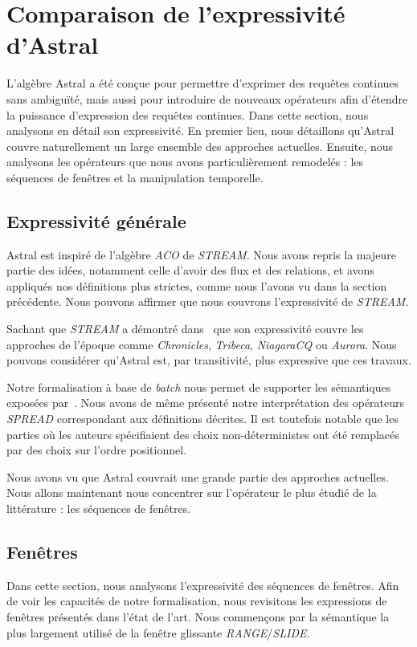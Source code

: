 \section{Comparaison de l'expressivité d'Astral}\label{sec:valid:expressivite:comparaison}
L'algèbre Astral a été conçue pour permettre d'exprimer des requêtes continues sans ambiguïté, mais aussi pour introduire de nouveaux opérateurs afin d'étendre la puissance d'expression des requêtes continues. Dans cette section, nous analysons en détail son expressivité. En premier lieu, nous détaillons qu'Astral couvre naturellement un large ensemble des approches actuelles. Ensuite, nous analysons les opérateurs que nous avons particulièrement remodelés : les séquences de fenêtres et la manipulation temporelle.

\subsection{Expressivité générale}
Astral est inspiré de l'algèbre \textit{ACO} de \textit{STREAM}. Nous avons repris la majeure partie des idées, notamment celle d'avoir des flux et des relations, et avons appliqués nos définitions plus strictes, comme nous l'avons vu dans la section précédente. Nous pouvons affirmer que nous couvrons l'expressivité de \textit{STREAM}.

Sachant que \textit{STREAM} a démontré dans~\cite{Arasu:stream} que son expressivité couvre les approches de l'époque comme \textit{Chronicles}, \textit{Tribeca}, \textit{NiagaraCQ} ou \textit{Aurora}. Nous pouvons considérer qu'Astral est, par transitivité, plus expressive que ces travaux.

Notre formalisation à base de \textit{batch} nous permet de supporter les sémantiques exposées par~\cite{Jain:spread}. Nous avons de même présenté notre interprétation des opérateurs \textit{SPREAD} correspondant aux définitions décrites. Il est toutefois notable que les parties où les auteurs spécifiaient des choix non-déterministes ont été remplacés par des choix sur l'ordre positionnel.

Nous avons vu que Astral couvrait une grande partie des approches actuelles. Nous allons maintenant nous concentrer sur l'opérateur le plus étudié de la littérature : les séquences de fenêtres.

\subsection{Fenêtres}
Dans cette section, nous analysons l'expressivité des séquences de fenêtres. Afin de voir les capacités de notre formalisation, nous revisitons les expressions de fenêtres présentés dans l'état de l'art. Nous commençons par la sémantique la plus largement utilisé de la fenêtre glissante \textit{RANGE}/\textit{SLIDE}.
